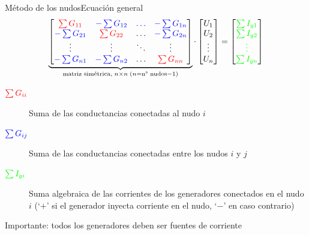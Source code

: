 \documentclass[aspectratio=169, xcolor={usenames,svgnames,dvipsnames}]{beamer}
\begin{document}

\begin{frame}{Método de los nudos}{Ecuación general}
    \begin{equation*}
		\underbrace{\begin{bmatrix}
			{\color{red}\sum G_{11}} &  {\color{blue}-\sum G_{12}} & {\color{blue}{\dots}} & {\color{blue}-\sum G_{1n}} \\
			{\color{blue}-\sum G_{21}} & {\color{red}\sum G_{22}} & {{\dots}} & {\color{blue}-\sum G_{2n}} \\
			{\vdots} & {\vdots} &  {\ddots} & \vdots\\
			{\color{blue}-\sum G_{n1}} & {\color{blue}-\sum G_{n2}} & \dots & {\color{red}\sum G_{nn}}
		\end{bmatrix}}_{\textrm{matriz simétrica}, \; n\times n \; (n=\textrm{n° nudos}-1)}  \cdot 
		\begin{bmatrix}
			U_1\\
			U_2\\
			\vdots\\
			U_n
		\end{bmatrix} = %
		\begin{bmatrix}
			{\color{green}\sum I_{g1}}\\
			{\color{green}\sum I_{g2}}\\
			{\color{green}\vdots}\\
			{\color{green}\sum I_{gn}}
		\end{bmatrix}
	\end{equation*}

    \begin{description}
    \item[{\({\color{red}\sum G_{ii}}\)}] Suma de las conductancias conectadas al nudo \(i\)
    \item[{\({\color{blue}\sum G_{ij}}\)}] Suma de las conductancias conectadas entre los nudos \(i\) y \(j\)
    \item[{\({\color{green}\sum I_{gi}}\)}] Suma algebraica de las corrientes de los generadores conectados en el nudo $i$ (`$+$' si el generador inyecta corriente en el nudo, `$-$' en caso contrario)
    \end{description}

    \vspace{3mm}
    
    \hspace{22mm}\alert{Importante}: todos los generadores deben ser fuentes de corriente
\end{frame}
\end{document}
